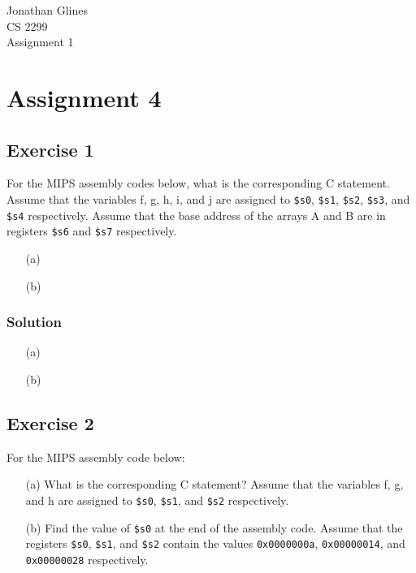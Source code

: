 \documentclass[12pt]{article}
\begin{document}
\begin{flushright}
{\Large Jonathan Glines \\
CS 2299 \\
Assignment 1 \\
}
\end{flushright}
\section*{Assignment 4}
\subsection*{Exercise 1}
For the MIPS assembly codes below, what is the corresponding C statement. Assume that the variables f, g, h, i, and j are assigned to {\tt \$s0}, {\tt \$s1}, {\tt \$s2}, {\tt \$s3}, and {\tt \$s4} respectively. Assume that the base address of the arrays A and B are in registers {\tt \$s6} and {\tt \$s7} respectively.
\begin{itemize}
\item[(a)]


\item[(b)]

\end{itemize}
\subsubsection*{Solution}
\begin{itemize}
\item[(a)] 

\item[(b)] 
\end{itemize}

\subsection*{Exercise 2}
For the MIPS assembly code below:
\begin{itemize}
\item[(a)] What is the corresponding C statement? Assume that the variables f, g, and h are assigned to {\tt \$s0}, {\tt \$s1}, and {\tt \$s2} respectively.
\item[(b)] Find the value of {\tt \$s0} at the end of the assembly code. Assume that the registers {\tt \$s0}, {\tt \$s1}, and {\tt \$s2} contain the values {\tt 0x0000000a}, {\tt 0x00000014}, and {\tt 0x00000028} respectively.
\end{itemize}

\end{document}
